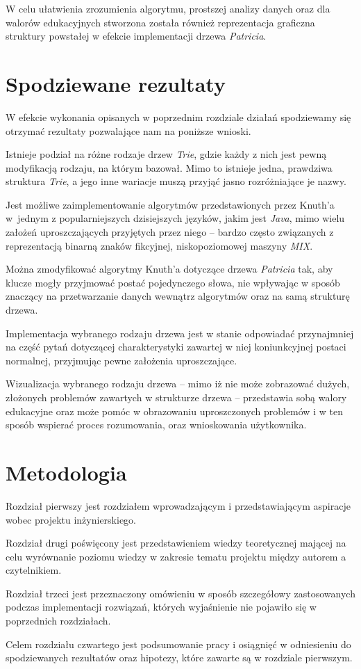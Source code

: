 	W celu ułatwienia zrozumienia algorytmu, prostszej analizy danych oraz dla walorów edukacyjnych stworzona została również reprezentacja graficzna struktury powstałej w efekcie implementacji drzewa \emph{Patricia}.
	
	\section{Spodziewane rezultaty}\label{sec:celePracySpodziewaneRezultaty}
	
	W efekcie wykonania opisanych w poprzednim rozdziale działań spodziewamy się otrzymać rezultaty pozwalające nam na poniższe wnioski.
	
   Istnieje podział na różne rodzaje drzew \emph{Trie}, gdzie każdy z nich jest pewną modyfikacją rodzaju, na którym bazował. Mimo to istnieje jedna, prawdziwa struktura \emph{Trie}, a jego inne wariacje muszą przyjąć jasno rozróżniające je nazwy.

    Jest możliwe zaimplementowanie algorytmów przedstawionych przez Knuth'a w~jednym z popularniejszych dzisiejszych języków, jakim jest \emph{Java}, mimo wielu założeń uproszczających przyjętych przez niego -- bardzo często związanych z reprezentacją binarną znaków fikcyjnej, niskopoziomowej maszyny \emph{MIX}.
    
    Można zmodyfikować algorytmy Knuth'a dotyczące drzewa \emph{Patricia} tak, aby klucze mogły przyjmować postać pojedynczego słowa, nie wpływając w sposób znaczący na przetwarzanie danych wewnątrz algorytmów oraz na samą strukturę drzewa.
    
    Implementacja wybranego rodzaju drzewa jest w stanie odpowiadać przynajmniej na część pytań dotyczącej charakterystyki zawartej w niej koniunkcyjnej postaci normalnej, przyjmując pewne założenia uproszczające.
    
    Wizualizacja wybranego rodzaju drzewa -- mimo iż nie może zobrazować dużych, złożonych problemów zawartych w strukturze drzewa -- przedstawia sobą walory edukacyjne oraz może pomóc w obrazowaniu uproszczonych problemów i w ten sposób wspierać proces rozumowania, oraz wnioskowania użytkownika.
		
	\section{Metodologia}\label{sec:celePracyMetodologia}
	
    Rozdział pierwszy jest rozdziałem wprowadzającym i przedstawiającym aspiracje wobec projektu inżynierskiego.
    
    Rozdział drugi poświęcony jest przedstawieniem wiedzy teoretycznej mającej na celu wyrównanie poziomu wiedzy w zakresie tematu projektu między autorem a czytelnikiem.
    
    Rozdział trzeci jest przeznaczony omówieniu w sposób szczegółowy zastosowanych podczas implementacji rozwiązań, których wyjaśnienie nie pojawiło się w poprzednich rozdziałach.
    
    Celem rozdziału czwartego jest podsumowanie pracy i osiągnięć w odniesieniu do spodziewanych rezultatów oraz hipotezy, które zawarte są w rozdziale pierwszym.
		